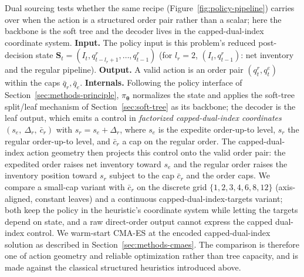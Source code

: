 \documentclass[11pt]{article}
\newcommand{\btheta}{\boldsymbol{\theta}}
\begin{document}
Dual sourcing tests whether the same recipe (Figure~\ref{fig:policy-pipeline}) carries over when the
action is a structured order pair rather than a scalar; here the backbone is the soft tree and the
decoder lives in the capped-dual-index coordinate system. \textbf{Input.} The policy input is this
problem's reduced post-decision state
$\mathbf S_t=(I_t, q^r_{t-l_r+1},\dots,q^r_{t-1})$ (for $l_r=2$, $(I_t,q^r_{t-1})$: net inventory and
the regular pipeline). \textbf{Output.} A valid action is an order pair $(q^r_t, q^e_t)$ within the
caps $\bar q_r,\bar q_e$. \textbf{Internals.} Following the policy interface of
Section~\ref{sec:methods-principle}, $\pi_{\btheta}$ normalizes the state and applies the soft-tree
split/leaf mechanism of Section~\ref{sec:soft-tree} as its backbone; the decoder is the leaf output,
which emits a control in \emph{factorized capped-dual-index coordinates} $(s_e,\ \Delta_r,\ \bar c_r)$ with
$s_r=s_e+\Delta_r$, where $s_e$ is the expedite order-up-to level, $s_r$ the regular order-up-to
level, and $\bar c_r$ a cap on the regular order. The capped-dual-index action geometry then projects
this control onto the valid order pair: the expedited order raises net inventory toward $s_e$ and the
regular order raises the inventory position toward $s_r$ subject to the cap $\bar c_r$ and the order
caps. We compare a small-cap variant with $\bar c_r$ on the discrete grid $\{1,2,3,4,6,8,12\}$
(axis-aligned, constant leaves) and a continuous capped-dual-index-targets variant; both keep the
policy in the heuristic's coordinate system while letting the targets depend on state, and a raw
direct-order output cannot express the capped dual-index control. We warm-start CMA-ES at the encoded
capped-dual-index solution as described in Section~\ref{sec:methods-cmaes}. The comparison is
therefore one of action geometry and reliable optimization rather than tree capacity, and is made
against the classical structured heuristics introduced above.
\end{document}
